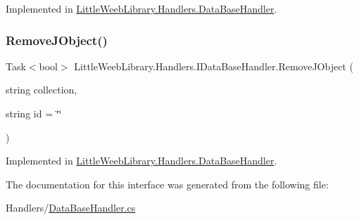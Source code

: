 Implemented in \mbox{\hyperlink{class_little_weeb_library_1_1_handlers_1_1_data_base_handler_ac9938b8d47b353d15c8e77e94849896e}{Little\+Weeb\+Library.\+Handlers.\+Data\+Base\+Handler}}.

\mbox{\label{interface_little_weeb_library_1_1_handlers_1_1_i_data_base_handler_a4d78b21102490d85906d0eb3f4693227}} 
\subsubsection{\texorpdfstring{Remove\+J\+Object()}{RemoveJObject()}\hspace{0.1cm}{\footnotesize\ttfamily [2/2]}}
{\footnotesize\ttfamily Task$<$bool$>$ Little\+Weeb\+Library.\+Handlers.\+I\+Data\+Base\+Handler.\+Remove\+J\+Object (\begin{DoxyParamCaption}\item[{string}]{collection,  }\item[{string}]{id = {\ttfamily \char`\"{}\char`\"{}} }\end{DoxyParamCaption})}



Implemented in \mbox{\hyperlink{class_little_weeb_library_1_1_handlers_1_1_data_base_handler_a7821535a003c7675c09ba846bd9502ca}{Little\+Weeb\+Library.\+Handlers.\+Data\+Base\+Handler}}.



The documentation for this interface was generated from the following file\+:\begin{DoxyCompactItemize}
\item 
Handlers/\mbox{\hyperlink{_data_base_handler_8cs}{Data\+Base\+Handler.\+cs}}\end{DoxyCompactItemize}
